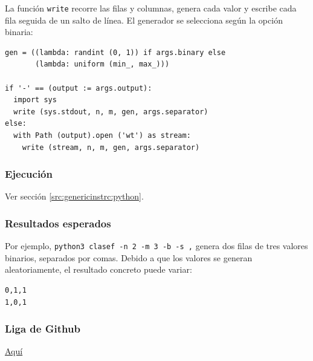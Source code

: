 \documentclass{article}[12pt,a4paper]
\begin{document}
La función \texttt{write} recorre las filas y columnas, genera cada valor y escribe cada fila seguida de un salto de línea. El generador se selecciona según la opción binaria:

\begin{verbatim}
gen = ((lambda: randint (0, 1)) if args.binary else
       (lambda: uniform (min_, max_)))

if '-' == (output := args.output):
  import sys
  write (sys.stdout, n, m, gen, args.separator)
else:
  with Path (output).open ('wt') as stream:
    write (stream, n, m, gen, args.separator)
\end{verbatim}

\subsubsection{Ejecución}

Ver sección \ref{src:genericinstrc:python}.

\subsubsection{Resultados esperados}

Por ejemplo, \texttt{python3 clasef -n 2 -m 3 -b -s ,} genera dos filas de tres valores binarios, separados por comas. Debido a que los valores se generan aleatoriamente, el resultado concreto puede variar:

\begin{verbatim}
0,1,1
1,0,1
\end{verbatim}

\subsubsection{Liga de \textbf{Github}}

\href{https://github.com/MarcosHCK/master-programming/tree/master/clasef}{Aquí \faGithubSquare}
\end{document}
